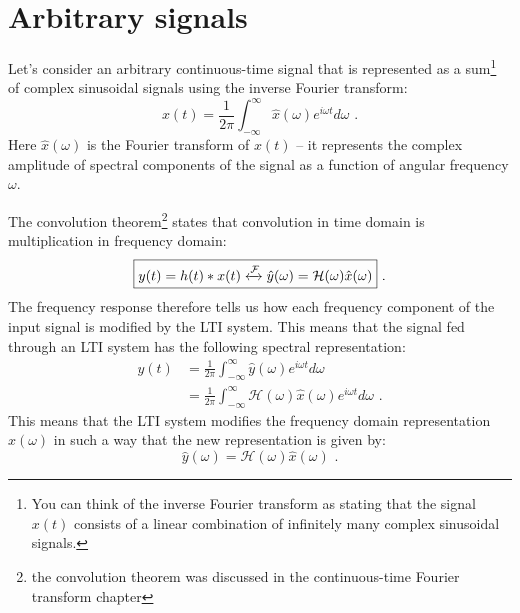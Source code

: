 


\section{Arbitrary signals}

Let's consider an arbitrary continuous-time signal that is represented
as a sum\footnote{You can think of the inverse Fourier transform as stating
that the signal $x(t)$ consists of a linear combination of infinitely many
complex sinusoidal signals.} of complex sinusoidal signals using the inverse Fourier transform:
\begin{equation}
x(t)  = \frac{1}{2\pi} \int_{-\infty}^{\infty} \hat{x}(\omega) e^{i \omega t} d\omega \,\,.
\end{equation}
Here $\hat{x}(\omega)$ is the Fourier transform of $x(t)$ -- it
represents the complex amplitude of spectral components of the signal
as a function of angular frequency $\omega$.

The convolution theorem\footnote{the convolution theorem was discussed
in the continuous-time Fourier transform chapter} states that
convolution in time domain is multiplication in frequency domain:
\begin{equation}
\boxed{
y(t) = h(t)*x(t) \xleftrightarrow{\mathcal{F}} \hat{y}(\omega)=\mathcal{H}(\omega)\hat{x}(\omega)
} \,\,.
\end{equation}
The frequency response therefore tells us how each frequency component
of the input signal is modified by the LTI system.
This means that the signal fed through an LTI system has the following spectral representation:
\begin{align}
y(t)  &= \frac{1}{2\pi} \int_{-\infty}^{\infty} \hat{y}(\omega) e^{i \omega t} d\omega\\
      &= \frac{1}{2\pi} \int_{-\infty}^{\infty} \mathcal{H}(\omega)\hat{x}(\omega) e^{i \omega t} d\omega \,\,.
\end{align}
This means that the LTI system modifies the frequency domain representation
$\hat{x}(\omega)$ in such a way that the new representation is given by:
\begin{equation}
\boxed{
\hat{y}(\omega) = \mathcal{H}(\omega)\hat{x}(\omega)
} \,\,.
\end{equation}
\fi


